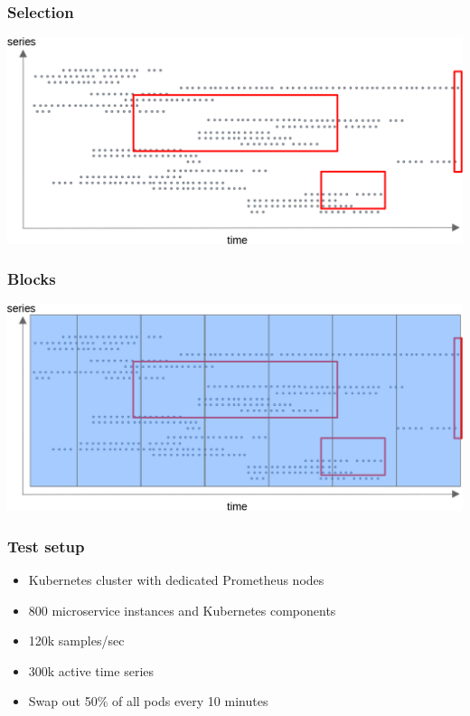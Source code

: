 \documentclass[t]{beamer}
\begin{document}
\begin{frame}
	\frametitle{Selection}
	\includegraphics[width=\textwidth]{storage--file_per_series_with_selection.png}
\end{frame}

\begin{frame}
	\frametitle{Blocks}
	\includegraphics[width=\textwidth]{storage--block_with_selection.png}
\end{frame}


\begin{frame}
	\frametitle{Test setup}
	\begin{itemize}
		\item Kubernetes cluster with dedicated Prometheus nodes
		\item 800 microservice instances and Kubernetes components
		\item 120k samples/sec
		\item 300k active time series
		\item Swap out 50\% of all pods every 10 minutes
	\end{itemize}
\end{frame}
\end{document}
